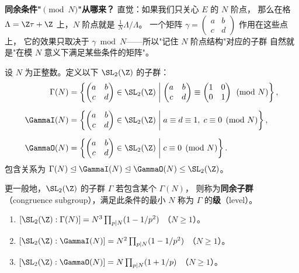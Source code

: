 \textbf{同余条件"$\pmod N$"从哪来？}
直觉：如果我们只关心 $E$ 的 $N$ 阶点，
那么在格 $\Lambda = \Z\tau + \Z$ 上，$N$ 阶点就是 $\frac{1}{N}\Lambda / \Lambda$。
一个矩阵 $\gamma = \begin{pmatrix}a&b\\c&d\end{pmatrix}$ 作用在这些点上，
它的效果只取决于 $\gamma \bmod N$——所以"记住 $N$ 阶点结构"对应的子群
自然就是"在模 $N$ 意义下满足某些条件的矩阵"。
\begin{definition}[同余子群]
\label{def:congruence-subgroups}
设 $N$ 为正整数。定义以下 $\SL_2(\Z)$ 的子群：
\begin{align}
  \Gamma(N) &= \left\{
    \begin{pmatrix} a & b \\ c & d \end{pmatrix} \in \SL_2(\Z)
    \;\middle|\;
    \begin{pmatrix} a & b \\ c & d \end{pmatrix}
    \equiv \begin{pmatrix} 1 & 0 \\ 0 & 1 \end{pmatrix} \pmod{N}
  \right\}, \\[6pt]
  \GammaI(N) &= \left\{
    \begin{pmatrix} a & b \\ c & d \end{pmatrix} \in \SL_2(\Z)
    \;\middle|\;
    a \equiv d \equiv 1,\; c \equiv 0 \pmod{N}
  \right\}, \\[6pt]
  \GammaO(N) &= \left\{
    \begin{pmatrix} a & b \\ c & d \end{pmatrix} \in \SL_2(\Z)
    \;\middle|\;
    c \equiv 0 \pmod{N}
  \right\}.
\end{align}
包含关系为 $\Gamma(N) \trianglelefteq \GammaI(N) \trianglelefteq \GammaO(N)
\leq \SL_2(\Z)$。

更一般地，$\SL_2(\Z)$ 的子群 $\Gamma$ 若包含某个 $\Gamma(N)$，
则称为\textbf{同余子群}（congruence subgroup），满足此条件的最小 $N$ 称为
$\Gamma$ 的\textbf{级}（level）。
\end{definition}

\begin{proposition}[指标公式]
\label{prop:index-formulas}
\leavevmode
\begin{enumerate}
  \item $[\SL_2(\Z) : \Gamma(N)] = N^3 \prod_{p \mid N}(1 - 1/p^2)$
    （$N \geq 1$）。
  \item $[\SL_2(\Z) : \GammaI(N)] = N^2 \prod_{p \mid N}(1 - 1/p^2)$
    （$N \geq 1$）。
  \item $[\SL_2(\Z) : \GammaO(N)] = N \prod_{p \mid N}(1 + 1/p)$
    （$N \geq 1$）。
\end{enumerate}
\end{proposition}

